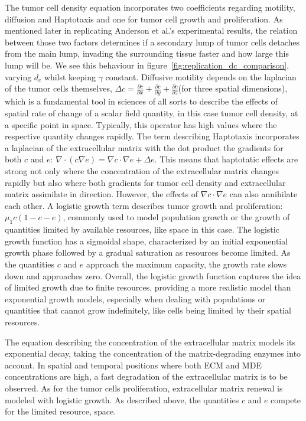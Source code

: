 The tumor cell density equation incorporates two coefficients regarding motility, diffusion and Haptotaxis and one for tumor cell growth and proliferation. As mentioned later in replicating Anderson et al.'s experimental results, the relation between those two factors determines if a secondary lump of tumor cells detaches from the main lump, invading the surrounding tissue faster and how large this lump will be. We see this behaviour in figure~\ref{fig:replication_dc_comparison}, varying $d_c$ whilst keeping $\gamma$ constant. Diffusive motility depends on the laplacian of the tumor cells themselves, $\Delta c = \frac{\partial c}{\partial x} + \frac{\partial c}{\partial y} + \frac{\partial c}{\partial z}$(for three spatial dimensions), which is a fundamental tool in sciences of all sorts to describe the effects of spatial rate of change of a scalar field quantity, in this case tumor cell density, at a specific point in space. Typically, this operator has high values where the respective quantity changes rapidly. The term describing Haptotaxis incorporates a laplacian of the extracellular matrix with the dot product the gradients for both $c$ and $e$: $\nabla \cdot (c\nabla e) = \nabla c \cdot \nabla e + \Delta e$. This means that haptotatic effects are strong not only where the concentration of the extracellular matrix changes rapidly but also where both gradients for tumor cell density and extracellular matrix assimilate in direction. However, the effects of $\nabla c \cdot \nabla e$ can also annihilate each other. A logistic growth term describes tumor growth and proliferation: $\mu_1 c (1-c-e)$, commonly used to model population growth or the growth of quantities limited by available resources, like space in this case. The logistic growth function has a sigmoidal shape, characterized by an initial exponential growth phase followed by a gradual saturation as resources become limited. As the quantities $c$ and $e$ approach the maximum capacity, the growth rate slows down and approaches zero. Overall, the logistic growth function captures the idea of limited growth due to finite resources, providing a more realistic model than exponential growth models, especially when dealing with populations or quantities that cannot grow indefinitely, like cells being limited by their spatial resources.

The equation describing the concentration of the extracellular matrix models its exponential decay, taking the concentration of the matrix-degrading enzymes into account. In spatial and temporal positions where both ECM and MDE concentrations are high, a fast degradation of the extracellular matrix is to be observed. As for the tumor cells proliferation, extracellular matrix renewal is modeled with logistic growth. As described above, the quantities $c$ and $e$ compete for the limited resource, space.


